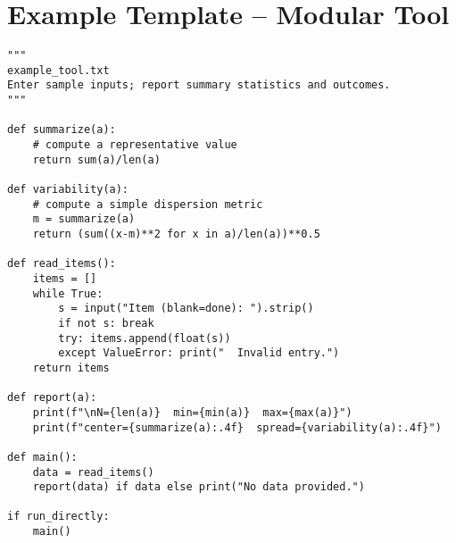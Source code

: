 \documentclass[11pt]{article}
\begin{document}
\section*{\textcolor{gatororange}{Example Template – Modular Tool}}

\begin{framed}\scriptsize
\begin{verbatim}
"""
example_tool.txt
Enter sample inputs; report summary statistics and outcomes.
"""

def summarize(a): 
    # compute a representative value
    return sum(a)/len(a)

def variability(a):
    # compute a simple dispersion metric
    m = summarize(a)
    return (sum((x-m)**2 for x in a)/len(a))**0.5

def read_items():
    items = []
    while True:
        s = input("Item (blank=done): ").strip()
        if not s: break
        try: items.append(float(s))
        except ValueError: print("  Invalid entry.")
    return items

def report(a):
    print(f"\nN={len(a)}  min={min(a)}  max={max(a)}")
    print(f"center={summarize(a):.4f}  spread={variability(a):.4f}")

def main():
    data = read_items()
    report(data) if data else print("No data provided.")

if run_directly:
    main()
\end{verbatim}
\end{framed}

\end{document}
